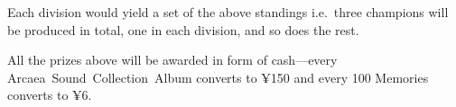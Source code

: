 \documentclass{article}
\begin{document}
Each division would yield a set of the above standings
i.e.~three champions will be produced in total,
one in each division, and so does the rest.

All the prizes above will be awarded in form of  %
cash---every Arcaea Sound Collection Album converts to ¥150
and every 100 Memories converts  %
to ¥6.
\end{document}
